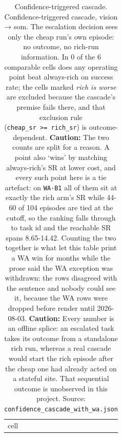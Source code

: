 \begin{table}[tp]
\centering
\caption{Confidence-triggered cascade. Confidence-triggered cascade, vision → som. The escalation decision sees only the cheap run's own episode: no outcome, no rich-run information. In 0 of the 6 comparable cells does any operating point beat always-rich on success rate; the cells marked \emph{rich is worse} are excluded because the cascade's premise fails there, and that exclusion rule (\texttt{cheap\_sr\ \textgreater{}=\ rich\_sr}) is outcome-dependent. \textbf{Caution:} The two counts are split for a reason. A point also `wins' by matching always-rich's SR at lower cost, and every such point here is a tie artefact: on \texttt{WA·B1} all of them sit at exactly the rich arm's SR while 44-60 of 104 episodes are tied at the cutoff, so the ranking falls through to task id and the reachable SR spans 8.65-14.42. Counting the two together is what let this table print a WA win for months while the prose said the WA exception was withdrawn: the rows disagreed with the sentence and nobody could see it, because the WA rows were dropped before render until 2026-08-03. \textbf{Caution:} Every number is an offline splice: an escalated task takes its outcome from a standalone rich run, whereas a real cascade would start the rich episode after the cheap one had already acted on a stateful site. That sequential outcome is unobserved in this project. Source: \texttt{confidence\_cascade\_with\_wa.json}}
\label{tab:t20}
\footnotesize
\setlength{\tabcolsep}{3pt}
\begin{tabular}{@{}
  >{\raggedright\arraybackslash}p{}
  >{\raggedright\arraybackslash}p{}
  >{\raggedright\arraybackslash}p{}
  >{\raggedright\arraybackslash}p{}
  >{\raggedright\arraybackslash}p{}
  >{\raggedright\arraybackslash}p{}
  >{\raggedright\arraybackslash}p{}
  >{\raggedright\arraybackslash}p{}
  >{\raggedright\arraybackslash}p{}@{}}
\toprule
\begin{minipage}[b]{\linewidth}\raggedright
cell
\end{minipage} & \begin{minipage}[b]{\linewidth}\raggedright

\end{minipage}
\end{tabular}
\end{table}
